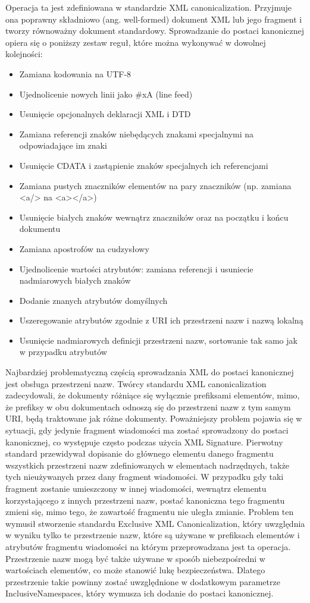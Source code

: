 Operacja ta jest zdefiniowana w standardzie XML canonicalization. Przyjmuje ona poprawny składniowo (ang. well-formed) dokument XML lub jego fragment i tworzy równoważny dokument standardowy\cite{Boyer:01:CXV}. Sprowadzanie do postaci kanonicznej opiera się o poniższy zestaw reguł, które można wykonywać w dowolnej kolejności:
\begin{itemize}
\item Zamiana kodowania na UTF-8
\item Ujednolicenie nowych linii jako \#xA (line feed)
\item Usunięcie opcjonalnych deklaracji XML i DTD
\item Zamiana referencji znaków niebędących znakami specjalnymi na odpowiadające im znaki
\item Usunięcie CDATA i zastąpienie znaków specjalnych ich referencjami
\item Zamiana pustych znaczników elementów na pary znaczników (np. zamiana <a/> na <a></a>)
\item Usunięcie białych znaków wewnątrz znaczników oraz na początku i końcu dokumentu
\item Zamiana apostrofów na cudzysłowy
\item Ujednolicenie wartości atrybutów: zamiana referencji i usuniecie nadmiarowych białych znaków
\item Dodanie znanych atrybutów domyślnych
\item Uszeregowanie atrybutów zgodnie z URI ich przestrzeni nazw i nazwą lokalną
\item Usunięcie nadmiarowych definicji przestrzeni nazw, sortowanie tak samo jak w przypadku atrybutów
\end{itemize}

Najbardziej  problematyczną częścią sprowadzania XML do postaci kanonicznej jest obsługa przestrzeni nazw. Twórcy standardu XML canonicalization zadecydowali, że dokumenty różniące się wyłącznie prefiksami elementów, mimo, że prefiksy w obu dokumentach odnoszą się do przestrzeni nazw z tym samym URI, będą traktowane jak różne dokumenty. Poważniejszy problem pojawia się w sytuacji, gdy jedynie fragment wiadomości ma zostać sprowadzony do postaci kanonicznej, co występuje często podczas użycia XML Signature. Pierwotny standard przewidywał dopisanie do głównego elementu danego fragmentu wszystkich przestrzeni nazw zdefiniowanych w elementach nadrzędnych, także tych nieużywanych przez dany fragment wiadomości. W przypadku gdy taki fragment zostanie umieszczony w innej wiadomości, wewnątrz elementu korzystającego z innych przestrzeni nazw, postać kanoniczna tego fragmentu zmieni się, mimo tego, że zawartość fragmentu nie uległa zmianie. Problem ten wymusił stworzenie standardu Exclusive XML Canonicalization, który uwzględnia w wyniku tylko te przestrzenie nazw, które są używane w prefiksach elementów i atrybutów fragmentu wiadomości na którym przeprowadzana jest ta operacja\cite{Boyer:02:EXC}. Przestrzenie nazw mogą być także używane w sposób niebezpośredni w wartościach elementów, co może stanowić lukę bezpieczeństwa. Dlatego przestrzenie takie powinny zostać uwzględnione w dodatkowym parametrze InclusiveNamespaces, który wymusza ich dodanie do postaci kanonicznej.


